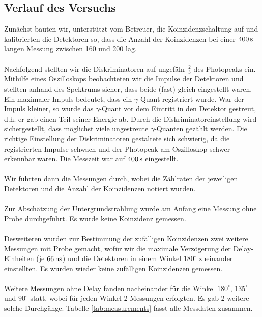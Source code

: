 \documentclass[a4paper,titlepage]{scrartcl}
\numberwithin{equation}{section}
\begin{document}
\subsection{Verlauf des Versuchs}
Zunächst bauten wir, unterstützt vom Betreuer, die Koinzidenzschaltung auf und kalibrierten die Detektoren so, dass die Anzahl der Koinzidenzen bei einer $\unit[400]{s}$ langen Messung zwischen 160 und 200 lag.\\ \\
Nachfolgend stellten wir die Diskriminatoren auf ungefähr $\frac{2}{3}$ des Photopeaks ein. Mithilfe eines Oszilloskops beobachteten wir die Impulse der Detektoren und stellten anhand des Spektrums sicher, dass beide (fast) gleich eingestellt waren. Ein maximaler Impuls bedeutet, dass ein $\gamma$-Quant registriert wurde. War der Impuls kleiner, so wurde das $\gamma$-Quant vor dem Eintritt in den Detektor gestreut, d.h. er gab einen Teil seiner Energie ab. Durch die Diskriminatoreinstellung wird sichergestellt, dass möglichst viele ungestreute $\gamma$-Quanten gezählt werden. Die richtige Einstellung der Diskriminatoren gestaltete sich schwierig, da die registrierten Impulse schwach und der Photopeak am Oszilloskop schwer erkennbar waren. Die Messzeit war auf $\unit[400]{s}$ eingestellt.\\ \\
Wir führten dann die Messungen durch, wobei die Zählraten der jeweiligen Detektoren und die Anzahl der Koinzidenzen notiert wurden.\\ \\
Zur Abschätzung der Untergrundstrahlung wurde am Anfang eine Messung ohne Probe durchgeführt. Es wurde keine Koinzidenz gemessen.\\ \\
Desweiteren wurden zur Bestimmung der zufälligen Koinzidenzen zwei weitere Messungen mit Probe gemacht, wofür wir die maximale Verzögerung der Delay-Einheiten (je $\unit[66]{ns}$) und die Detektoren in einem Winkel $180^{\circ}$ zueinander einstellten. Es wurden wieder keine zufälligen Koinzidenzen gemessen.\\ \\
Weitere Messungen ohne Delay fanden nacheinander für die Winkel $180^{\circ}$, $135^{\circ}$ und $90^{\circ}$ statt, wobei für jeden Winkel 2 Messungen erfolgten. Es gab 2 weitere solche Durchgänge. Tabelle \ref{tab:measurements} fasst alle Messdaten zusammen.
\end{document}
